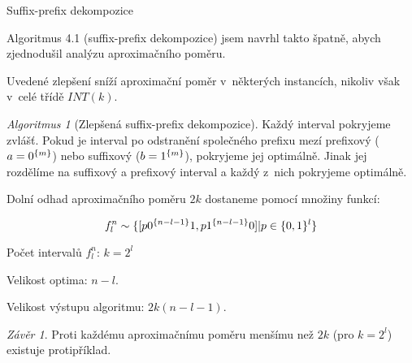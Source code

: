 \documentclass{beamer}
\theoremstyle{remark}
\newtheorem{algorithm}{Algoritmus}
\newtheorem{conclusion}{Závěr}
\begin{document}
\begin{frame}{Suffix-prefix dekompozice}

Algoritmus 4.1 (suffix-prefix dekompozice) jsem navrhl takto špatně, abych zjednodušil analýzu aproximačního poměru.

Uvedené zlepšení sníží aproximační poměr v~některých instancích, nikoliv však v~celé třídě $INT(k)$.

\begin{algorithm}[Zlepšená suffix-prefix dekompozice]
Každý interval pokryjeme zvlášť.
Pokud je interval po odstranění společného prefixu mezí prefixový ($a = 0^{\{m\}}$) nebo suffixový ($b = 1^{\{m\}}$), pokryjeme jej optimálně.
Jinak jej rozdělíme na suffixový a prefixový interval a každý z~nich pokryjeme optimálně.
\end{algorithm}


Dolní odhad aproximačního poměru $2k$ dostaneme pomocí množiny  funkcí:

$$
f_l^n \sim \{[p 0^{\{n-l-1\}} 1, p 1^{\{n-l-1\}} 0] | p \in \{0, 1\}^l\}
$$

Počet intervalů $f_l^n$: $k = 2^l$

Velikost optima: $n-l$.

Velikost výstupu algoritmu: $2k (n-l-1)$.

\begin{conclusion}
Proti každému aproximačnímu poměru menšímu než $2k$ (pro $k = 2^l$) existuje protipříklad.
\end{conclusion}
\end{frame}
\end{document}
